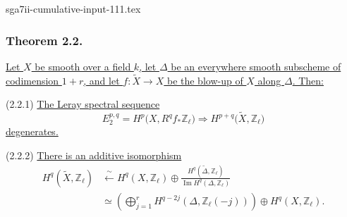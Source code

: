 \begin{filecontents*}{sga7ii-cumulative-input-111.tex}
\subsubsection*{Theorem 2.2.}
\underline{Let $X$ be smooth over a field $k$, let $\Delta$ be an everywhere
smooth subscheme of codimension $1+r$, and let
$f:\widetilde X\longrightarrow X$ be the blow-up of $X$ along $\Delta$.
Then:}

\medskip
\noindent(2.2.1) \underline{The Leray spectral sequence}
\[
E_2^{p,q}=H^p\bigl(X,R^qf_*\mathbb Z_\ell\bigr)
\Longrightarrow
H^{p+q}\bigl(\widetilde X,\mathbb Z_\ell\bigr)
\]
\underline{degenerates.}

\medskip
\noindent(2.2.2) \underline{There is an additive isomorphism}
\[
\begin{aligned}
H^q(\widetilde X,\mathbb Z_\ell)
&\xleftarrow{\ \sim\ }
H^q(X,\mathbb Z_\ell)\oplus
\frac{H^q(\widetilde\Delta,\mathbb Z_\ell)}
     {\operatorname{Im}H^q(\Delta,\mathbb Z_\ell)}
\\
&\simeq
\left(\bigoplus_{j=1}^{r}
H^{q-2j}(\Delta,\mathbb Z_\ell(-j))\right)
\oplus H^q(X,\mathbb Z_\ell).
\end{aligned}
\]


\end{filecontents*}
